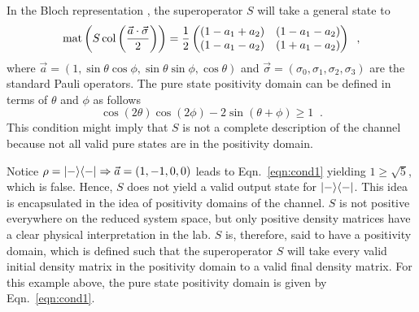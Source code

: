 In the Bloch representation \cite{Bloch1946,Nielsen2010}, the superoperator $S$ will take a general state to
$$
\operatorname{mat}\left(S\operatorname{col}\left(\frac{\vec{a}\cdot\vec{\sigma}}{2}\right)\right) = \frac{1}{2}\begin{pmatrix}
 (1-a_1+a_2) & (1-a_1-a_2) \\
 (1-a_1-a_2) & (1+a_1-a_2)
\end{pmatrix}\;\;,
$$
where $\vec{a} = (1,\sin\theta\cos\phi,\sin\theta\sin\phi,\cos\theta)$ and $\vec{\sigma}=(\sigma_0,\sigma_1,\sigma_2,\sigma_3)$ are the standard Pauli operators.  The pure state positivity domain can be defined in terms of $\theta$ and $\phi$ as follows
\begin{equation}
\label{eqn:cond1}
\cos\left(2 \theta\right) \cos\left(2 \phi\right)-2 \sin\left(\theta+\phi\right)\ge 1\;\;.
\end{equation}
This condition might imply that $S$ is not a complete description of the channel because not all valid pure states are in the positivity domain.

Notice $\rho=|-\rangle\langle-|\Rightarrow\vec{a}=(1,-1,0,0)$ leads to Eqn.\ \ref{eqn:cond1} yielding $1\ge\sqrt{5}$, which is false.  Hence, $S$ does not yield a valid output state for $|-\rangle\langle-|$.  This idea is encapsulated in the idea of positivity domains of the channel.  $S$ is not positive everywhere on the reduced system space, but only positive density matrices have a clear physical interpretation in the lab.  $S$ is, therefore, said to have a positivity domain, which is defined such that the superoperator $S$ will take every valid initial density matrix in the positivity domain to a valid final density matrix.  For this example above, the pure state positivity domain is given by Eqn.\ \ref{eqn:cond1}.

